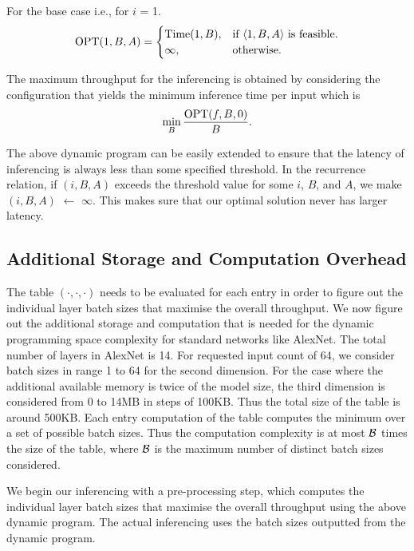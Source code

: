 For the base case i.e., for $i$ = 1.
\begin{equation*}
  {\rm OPT}(1, B, A) =\begin{cases}
     {\rm Time}(1, B), & \text{if $\langle 1,B,A \rangle$ is feasible}.\\
    \infty, & \text{otherwise}.
  \end{cases}
\end{equation*} 





 
The maximum throughput for the inferencing is obtained 
by considering the configuration that yields the 
minimum inference time per input which is 
$$\min \limits_{ B} \frac{ {\rm OPT}(f, B, 0)}{B}. $$ 



The above dynamic program can be easily extended to ensure that the latency of inferencing is always less than some specified threshold. In the recurrence relation,
if \OPT$(i, B, A)$ exceeds the threshold value for some $i$, $B$, and $A$, we make   \OPT$(i, B, A)$ $\leftarrow$ $\infty$. This makes sure that our optimal solution 
never has larger latency.

\subsection{Additional Storage and Computation Overhead}
The table \OPT$(\cdot, \cdot, \cdot)$ needs to be evaluated for each entry in order to figure out the individual layer batch sizes that maximise the overall throughput.
We  now figure out the additional storage and computation that is needed for the dynamic programming space complexity for standard networks like AlexNet. 
The total number of layers in AlexNet  is 14. For requested input count of 64, we consider batch sizes 
in range 1 to 64 for the second dimension. For the case where the additional available memory is twice of the model size, the third dimension is considered from 0 to 14MB
in steps of {100KB}. Thus the total size of the table is around 500KB.
Each entry computation of the table computes the minimum over a set of possible batch sizes. Thus the computation complexity is at most $\cal B$ times the size of the table,
where $\cal B$ is the maximum number of distinct batch sizes considered.

We begin our  inferencing  with a pre-processing step, which computes the  individual layer batch sizes that maximise the overall throughput using the
above dynamic program.  The actual inferencing uses the batch sizes outputted from the dynamic program.










